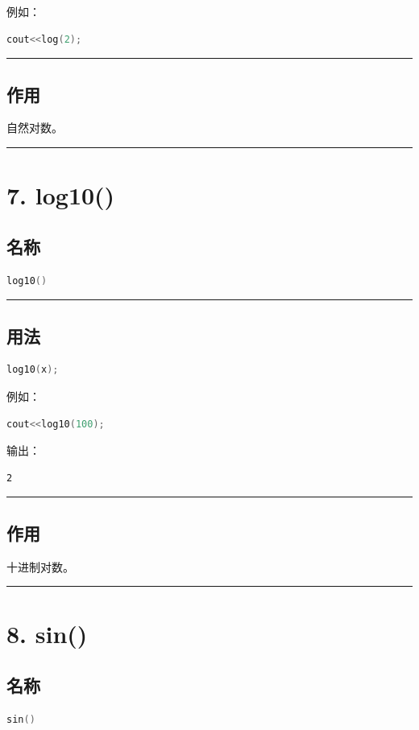 \documentclass[10pt,twocolumn]{extarticle}
\begin{document}
例如：
\begin{lstlisting}[language=C++]
cout<<log(2);
\end{lstlisting}

\noindent\rule{\linewidth}{0.4pt}

\subsection{作用}
自然对数。

\noindent\rule{\linewidth}{0.4pt}

\section{7. log10()}

\subsection{名称}
\begin{lstlisting}[language=C++]
log10()
\end{lstlisting}

\noindent\rule{\linewidth}{0.4pt}

\subsection{用法}
\begin{lstlisting}[language=C++]
log10(x);
\end{lstlisting}
例如：
\begin{lstlisting}[language=C++]
cout<<log10(100);
\end{lstlisting}
输出：
\begin{lstlisting}
2
\end{lstlisting}

\noindent\rule{\linewidth}{0.4pt}

\subsection{作用}
十进制对数。

\noindent\rule{\linewidth}{0.4pt}

\section{8. sin()}

\subsection{名称}
\begin{lstlisting}[language=C++]
sin()
\end{lstlisting}
\end{document}
